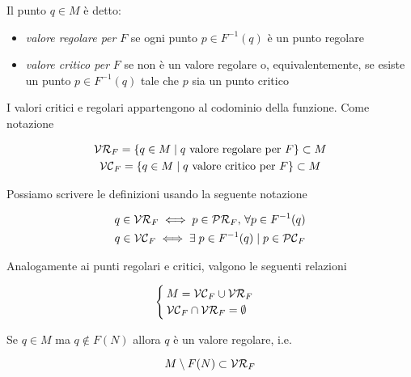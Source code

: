 Il punto $ q \in M $ è detto:

\begin{itemize}
	\item \textit{valore regolare per} $ F $ se ogni punto $ p \in F^{-1}(q) $ è un punto regolare
	
	\item \textit{valore critico per} $ F $ se non è un valore regolare o, equivalentemente, se esiste un punto $ p \in F^{-1}(q) $ tale che $ p $ sia un punto critico
\end{itemize}

I valori critici e regolari appartengono al codominio della funzione. Come notazione

\begin{gather}
	\mathcal{VR}_{F} = \{ q \in M \mid q \text{ valore regolare per } F \} \subset M\\
	\mathcal{VC}_{F} = \{ q \in M \mid q \text{ valore critico per } F \} \subset M
\end{gather}

Possiamo scrivere le definizioni usando la seguente notazione

\begin{gather}
	q \in \mathcal{VR}_{F} \iff p \in \mathcal{PR}_{F}, \, \forall p \in F^{-1}(q)\\
	q \in \mathcal{VC}_{F} \iff \exists \; p \in F^{-1}(q) \mid p \in \mathcal{PC}_{F}
\end{gather}

Analogamente ai punti regolari e critici, valgono le seguenti relazioni

\begin{equation}
	\begin{cases}
		M = \mathcal{VC}_{F} \cup \mathcal{VR}_{F}\\
		\mathcal{VC}_{F} \cap \mathcal{VR}_{F} = \emptyset
	\end{cases}
\end{equation}

\begin{remark}
	Se $ q \in M $ ma $ q \notin F(N) $ allora $ q $ è un valore regolare, i.e.
	
	\begin{equation}
		M \setminus F(N) \subset \mathcal{VR}_{F}
	\end{equation}
\end{remark}

